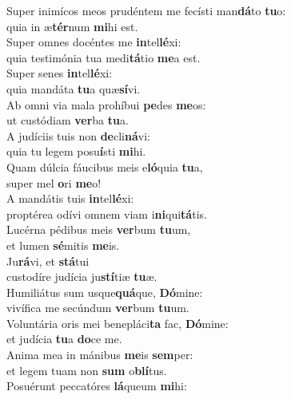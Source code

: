 \evenverse Super inimícos meos prudéntem me fecísti man\textbf{dá}to \textbf{tu}o:~\*\\
\evenverse quia in æ\textbf{tér}num \textbf{mi}hi est.\\
\oddverse Super omnes docéntes me \textbf{in}tel\textbf{lé}xi:~\*\\
\oddverse quia testimónia tua medi\textbf{tá}tio \textbf{me}a est.\\
\evenverse Super senes \textbf{in}tel\textbf{lé}xi:~\*\\
\evenverse quia mandáta \textbf{tu}a quæ\textbf{sí}vi.\\
\oddverse Ab omni via mala prohíbui \textbf{pe}des \textbf{me}os:~\*\\
\oddverse ut custódiam \textbf{ver}ba \textbf{tu}a.\\
\evenverse A judíciis tuis non \textbf{de}cli\textbf{ná}vi:~\*\\
\evenverse quia tu legem posu\textbf{í}sti \textbf{mi}hi.\\
\oddverse Quam dúlcia fáucibus meis e\textbf{ló}quia \textbf{tu}a,~\*\\
\oddverse super mel \textbf{o}ri \textbf{me}o!\\
\evenverse A mandátis tuis \textbf{in}tel\textbf{lé}xi:~\*\\
\evenverse proptérea odívi omnem viam i\textbf{ni}qui\textbf{tá}tis.\\
\oddverse Lucérna pédibus meis \textbf{ver}bum \textbf{tu}um,~\*\\
\oddverse et lumen \textbf{sé}mitis \textbf{me}is.\\
\evenverse Ju\textbf{rá}vi, et \textbf{stá}tui~\*\\
\evenverse custodíre judícia ju\textbf{stí}tiæ \textbf{tu}æ.\\
\oddverse Humiliátus sum usque\textbf{quá}que, \textbf{Dó}mine:~\*\\
\oddverse vivífica me secúndum \textbf{ver}bum \textbf{tu}um.\\
\evenverse Voluntária oris mei benepláci\textbf{ta} fac, \textbf{Dó}mine:~\*\\
\evenverse et judícia \textbf{tu}a \textbf{do}ce me.\\
\oddverse Anima mea in mánibus \textbf{me}is \textbf{sem}per:~\*\\
\oddverse et legem tuam non \textbf{sum} o\textbf{blí}tus.\\
\evenverse Posuérunt peccatóres \textbf{lá}queum \textbf{mi}hi:~\*\\
